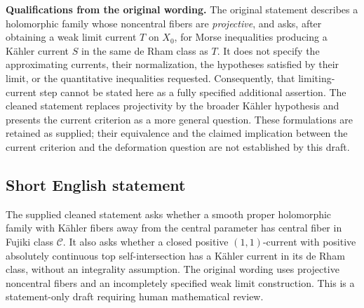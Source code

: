 \documentclass[11pt]{article}
\begin{document}
\textbf{Qualifications from the original wording.} The original statement describes a holomorphic family whose noncentral fibers are \emph{projective}, and asks, after obtaining a weak limit current \(T\) on \(X_0\), for Morse inequalities producing a Kähler current \(S\) in the same de Rham class as \(T\). It does not specify the approximating currents, their normalization, the hypotheses satisfied by their limit, or the quantitative inequalities requested. Consequently, that limiting-current step cannot be stated here as a fully specified additional assertion. The cleaned statement replaces projectivity by the broader Kähler hypothesis and presents the current criterion as a more general question. These formulations are retained as supplied; their equivalence and the claimed implication between the current criterion and the deformation question are not established by this draft.
\subsection{Short English statement}
The supplied cleaned statement asks whether a smooth proper holomorphic family with Kähler fibers away from the central parameter has central fiber in Fujiki class \(\mathcal C\). It also asks whether a closed positive \((1,1)\)-current with positive absolutely continuous top self-intersection has a Kähler current in its de Rham class, without an integrality assumption. The original wording uses projective noncentral fibers and an incompletely specified weak limit construction. This is a statement-only draft requiring human mathematical review.
\end{document}
